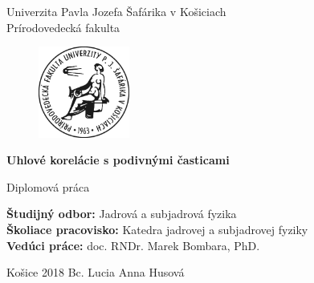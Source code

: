 \documentclass[thesismargins, thesislinespacing]{rnthesis}
\title{}
\author{Lucia Anna Husová}
\begin{document}
\begin{center}
	{\Large Univerzita Pavla Jozefa Šafárika v Košiciach} \\
	{\Large Prírodovedecká fakulta} 
\end{center}

\vspace*{2cm}

\begin{figure}[htbp!]
	\begin{center}
		\includegraphics[width=3cm]{./Obrazky_praca/logo-pf-upjs-cb.jpg}
	\end{center}
\end{figure}

\vspace*{2cm}

\begin{center}
	{\LARGE\bf Uhlové korelácie s podivnými časticami}
\end{center}

\begin{center}
	{\large Diplomová práca}
\end{center}

\vspace*{5cm}
\begin{flushleft}
{\bf Študijný odbor:}{ Jadrová a subjadrová fyzika} \\
{\bf Školiace pracovisko: }{Katedra jadrovej a subjadrovej fyziky}\\
{\bf Vedúci práce: }{doc. RNDr. Marek Bombara, PhD.}\\
\end{flushleft}
 
 \vspace*{2cm}
 \begin{flushleft}
{\large Košice 2018}
\hspace*{5cm}
{\large Bc. Lucia Anna Husová}
\end{flushleft}

\thispagestyle{empty}
\newpage

\maketitle
\newpage
\tableofcontents
\newpage
\end{document}
